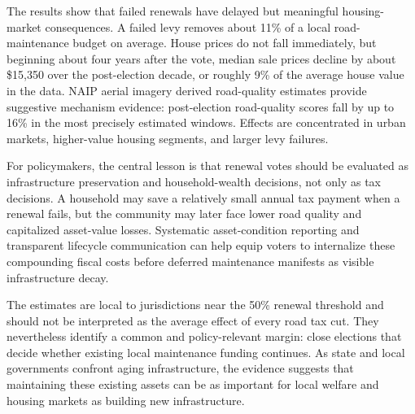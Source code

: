 The results show that failed renewals have delayed but meaningful housing-market consequences. A failed levy removes about 11\% of a local road-maintenance budget on average. House prices do not fall immediately, but beginning about four years after the vote, median sale prices decline by about \$15,350 over the post-election decade, or roughly 9\% of the average house value in the data. NAIP aerial imagery derived road-quality estimates provide suggestive mechanism evidence: post-election road-quality scores fall by up to 16\% in the most precisely estimated windows. Effects are concentrated in urban markets, higher-value housing segments, and larger levy failures.

For policymakers, the central lesson is that renewal votes should be evaluated as infrastructure preservation and household-wealth decisions, not only as tax decisions. A household may save a relatively small annual tax payment when a renewal fails, but the community may later face lower road quality and capitalized asset-value losses. Systematic asset-condition reporting and transparent lifecycle communication can help equip voters to internalize these compounding fiscal costs before deferred maintenance manifests as visible infrastructure decay.


The estimates are local to jurisdictions near the 50\% renewal threshold and should not be interpreted as the average effect of every road tax cut. They nevertheless identify a common and policy-relevant margin: close elections that decide whether existing local maintenance funding continues.
As state and local governments confront aging infrastructure, the evidence suggests that maintaining these existing assets can be as important for local welfare and housing markets as building new infrastructure.



